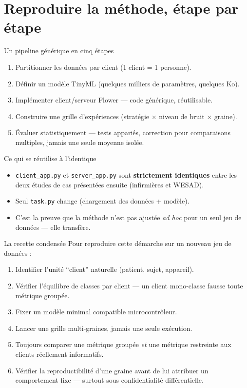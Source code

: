 \documentclass[aspectratio=169,11pt]{beamer}
\begin{document}
\section{Reproduire la méthode, étape par étape}

\begin{frame}{Un pipeline générique en cinq étapes}
  \begin{enumerate}
    \item Partitionner les données par client (1 client = 1 personne).
    \item Définir un modèle TinyML (quelques milliers de paramètres,
      quelques Ko).
    \item Implémenter client/serveur Flower --- code générique, réutilisable.
    \item Construire une grille d'expériences (stratégie $\times$ niveau de
      bruit $\times$ graine).
    \item Évaluer statistiquement --- tests appariés, correction pour
      comparaisons multiples, jamais une seule moyenne isolée.
  \end{enumerate}
\end{frame}

\begin{frame}{Ce qui se réutilise à l'identique}
  \begin{itemize}
    \item \texttt{client\_app.py} et \texttt{server\_app.py} sont
      \textbf{strictement identiques} entre les deux études de cas
      présentées ensuite (infirmières et WESAD).
    \item Seul \texttt{task.py} change (chargement des données + modèle).
    \item C'est la preuve que la méthode n'est pas ajustée \emph{ad hoc}
      pour un seul jeu de données --- elle transfère.
  \end{itemize}
\end{frame}

\begin{frame}{La recette condensée}
  \small
  Pour reproduire cette démarche sur un nouveau jeu de données :
  \begin{enumerate}
    \item Identifier l'unité ``client'' naturelle (patient, sujet, appareil).
    \item Vérifier l'équilibre de classes par client --- un client
      mono-classe fausse toute métrique groupée.
    \item Fixer un modèle minimal compatible microcontrôleur.
    \item Lancer une grille multi-graines, jamais une seule exécution.
    \item Toujours comparer une métrique groupée \emph{et} une métrique
      restreinte aux clients réellement informatifs.
    \item Vérifier la reproductibilité d'une graine avant de lui attribuer
      un comportement fixe --- surtout sous confidentialité différentielle.
  \end{enumerate}
\end{frame}
\end{document}
